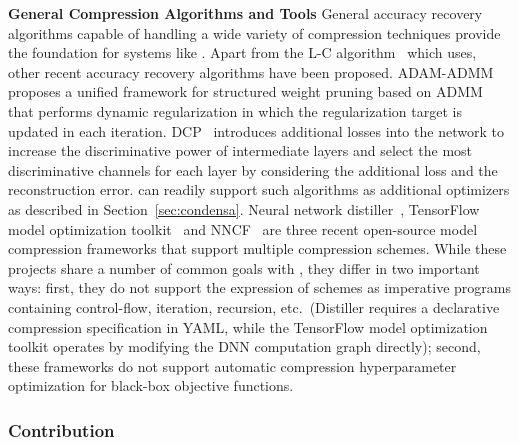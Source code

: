 \noindent \textbf{General Compression Algorithms and Tools} General accuracy recovery algorithms capable of handling a wide variety of compression techniques provide the foundation for systems like \algoName. Apart from the L-C algorithm~\cite{carreira2017model} which \algoName uses, other recent accuracy recovery algorithms have been proposed. ADAM-ADMM~\cite{zhang2018adam} proposes a unified framework for structured weight pruning based on ADMM that performs dynamic regularization in which the regularization target is updated in each iteration. DCP~\cite{zhuang2018discrimination} introduces additional losses into the network to increase the discriminative power of intermediate layers and select the most discriminative channels for each layer by considering the additional loss and the reconstruction error. \algoName can readily support such algorithms as additional optimizers as described in Section~\ref{sec:condensa}. Neural network distiller~\cite{neta_zmora_2018_1297430}, TensorFlow model optimization toolkit~\cite{tftoolkit} {\color{black} and NNCF~\cite{kozlov2020neural} are three recent open-source model compression frameworks that support multiple compression schemes.} While these projects share a number of common goals with \algoName, they differ in two important ways: first, they do not support the expression of schemes as imperative programs containing control-flow, iteration, recursion, etc.~(Distiller requires a declarative compression specification in YAML, while the TensorFlow model optimization toolkit operates by modifying the DNN computation graph directly); second, these frameworks do not support automatic compression hyperparameter optimization for black-box objective functions.

\subsubsection{Contribution}

